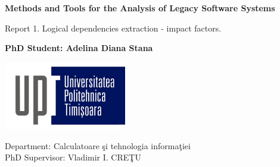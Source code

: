 \begin{titlepage}
    \begin{center}
        \vspace*{1cm}
        \large
        \textbf{Methods and Tools for the Analysis of Legacy Software Systems}
            
        \vspace{0.5cm}
        Report 1. Logical dependencies extraction - impact factors.
            
        \vspace{1.5cm}
            
        \textbf{PhD Student: Adelina Diana Stana}
            
        \vfill
            
        \vspace{0.8cm}
            
        \includegraphics[width=0.4\textwidth]{Logo-UPT.jpg}

        Department: Calculatoare şi tehnologia informaţiei\\
        PhD Supervisor: Vladimir I. CREŢU\\
            
    \end{center}
\end{titlepage}


